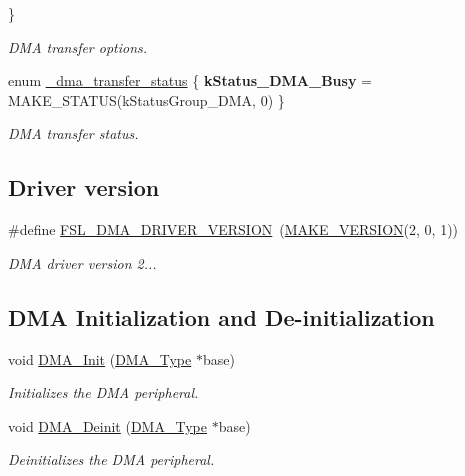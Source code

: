 \begin{DoxyCompactItemize}
 \}
\begin{DoxyCompactList}\small\item\em D\+MA transfer options. \end{DoxyCompactList}\item 
\mbox{\label{group__dma_ga63c0c8f218fd21a01a4996032b1f6ee0}} 
enum \mbox{\hyperlink{group__dma_ga63c0c8f218fd21a01a4996032b1f6ee0}{\+\_\+dma\+\_\+transfer\+\_\+status}} \{ {\bfseries k\+Status\+\_\+\+D\+M\+A\+\_\+\+Busy} = M\+A\+K\+E\+\_\+\+S\+T\+A\+T\+US(k\+Status\+Group\+\_\+\+D\+MA, 0)
 \}
\begin{DoxyCompactList}\small\item\em D\+MA transfer status. \end{DoxyCompactList}\end{DoxyCompactItemize}
\subsection*{Driver version}
\begin{DoxyCompactItemize}
\item 
\mbox{\label{group__dma_gac68c8082b53756a7e58ec6d5f25117d2}} 
\#define \mbox{\hyperlink{group__dma_gac68c8082b53756a7e58ec6d5f25117d2}{F\+S\+L\+\_\+\+D\+M\+A\+\_\+\+D\+R\+I\+V\+E\+R\+\_\+\+V\+E\+R\+S\+I\+ON}}~(\mbox{\hyperlink{group__ftfx__utilities_ga812138aa3315b0c6953c1a26130bcc37}{M\+A\+K\+E\+\_\+\+V\+E\+R\+S\+I\+ON}}(2, 0, 1))
\begin{DoxyCompactList}\small\item\em D\+MA driver version 2... \end{DoxyCompactList}\end{DoxyCompactItemize}
\subsection*{D\+MA Initialization and De-\/initialization}
\begin{DoxyCompactItemize}
\item 
void \mbox{\hyperlink{group__dma_gade1b5efa61054ce538b37b181dd075bb}{D\+M\+A\+\_\+\+Init}} (\mbox{\hyperlink{struct_d_m_a___type}{D\+M\+A\+\_\+\+Type}} $\ast$base)
\begin{DoxyCompactList}\small\item\em Initializes the D\+MA peripheral. \end{DoxyCompactList}\item 
void \mbox{\hyperlink{group__dma_ga634ced9b86d7dc9543e0b4387123fcac}{D\+M\+A\+\_\+\+Deinit}} (\mbox{\hyperlink{struct_d_m_a___type}{D\+M\+A\+\_\+\+Type}} $\ast$base)
\begin{DoxyCompactList}\small\item\em Deinitializes the D\+MA peripheral. \end{DoxyCompactList}\end{DoxyCompactItemize}
